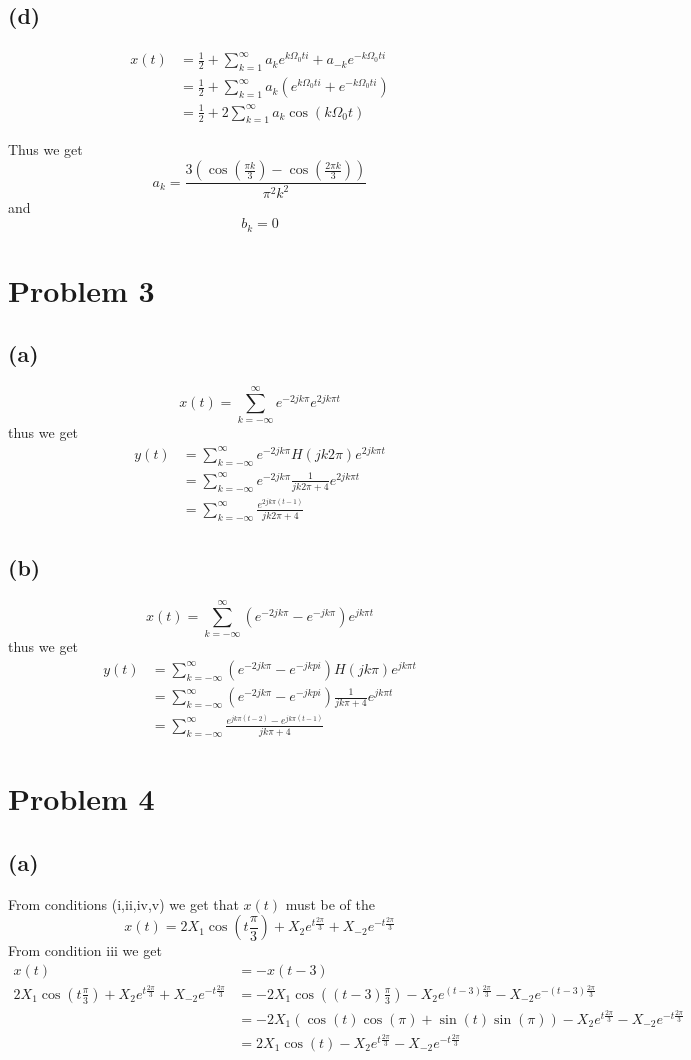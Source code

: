 \documentclass[12pt]{article}
\begin{document}
\subsection*{(d)}
\begin{align*}
x(t)&=\frac{1}{2}+\sum_{k=1}^{\infty}a_ke^{k\Omega_0ti}+a_{-k}e^{-k\Omega_0ti}\\
&=\frac{1}{2}+\sum_{k=1}^{\infty}a_k(e^{k\Omega_0ti}+e^{-k\Omega_0ti})\\
&=\frac{1}{2}+2\sum_{k=1}^{\infty}a_k\cos(k\Omega_0t)
\end{align*}

Thus we get
$$a_k=\frac{3(\cos(\frac{\pi k}{3})-\cos(\frac{2\pi k}{3}))}{\pi^2k^2}$$
and 
$$b_k=0$$
\section*{Problem 3}
\subsection*{(a)}
$$x(t)=\sum_{k=-\infty}^{\infty}e^{-2jk\pi}e^{2jk\pi t}$$
thus we get
\begin{align*}
y(t)&=\sum_{k=-\infty}^{\infty}e^{-2jk\pi}H(jk2\pi)e^{2jk\pi t}\\
&=\sum_{k=-\infty}^{\infty}e^{-2jk\pi}\frac{1}{jk2\pi+4}e^{2jk\pi t}\\
&=\sum_{k=-\infty}^{\infty}\frac{e^{2jk\pi(t-1)}}{jk2\pi+4}
\end{align*}
\subsection*{(b)}
$$x(t)=\sum_{k=-\infty}^{\infty}\left(e^{-2jk\pi}-e^{-jk\pi}\right)e^{jk\pi t}$$
thus we get
\begin{align*}
y(t)&=\sum_{k=-\infty}^{\infty}\left(e^{-2jk\pi}-e^{-jkpi}\right)H(jk\pi)e^{jk\pi t}\\
&=\sum_{k=-\infty}^{\infty}\left(e^{-2jk\pi}-e^{-jkpi}\right)\frac{1}{jk\pi+4}e^{jk\pi t}\\
&=\sum_{k=-\infty}^{\infty}\frac{e^{jk\pi(t-2)}-e^{jk\pi(t-1)}}{jk\pi+4}
\end{align*}
\section*{Problem 4}
\subsection*{(a)}
From conditions (i,ii,iv,v) we get that $x(t)$ must be of the 
$$x(t)=2X_1\cos(t\frac{\pi}{3})+X_2e^{t\frac{2\pi}{3}}+X_{-2}e^{-t\frac{2\pi}{3}}$$
From condition iii we get
\begin{align*}
x(t)&=-x(t-3)\\
2X_1\cos(t\frac{\pi}{3})+X_2e^{t\frac{2\pi}{3}}+X_{-2}e^{-t\frac{2\pi}{3}}&=-2X_1\cos((t-3)\frac{\pi}{3})-X_2e^{(t-3)\frac{2\pi}{3}}-X_{-2}e^{-(t-3)\frac{2\pi}{3}}\\
&=-2X_1\left(\cos(t)\cos(\pi)+\sin(t)\sin(\pi)\right)-X_2e^{t\frac{2\pi}{3}}-X_{-2}e^{-t\frac{2\pi}{3}}\\
&=2X_1\cos(t)-X_2e^{t\frac{2\pi}{3}}-X_{-2}e^{-t\frac{2\pi}{3}}
\end{align*}
\end{document}
